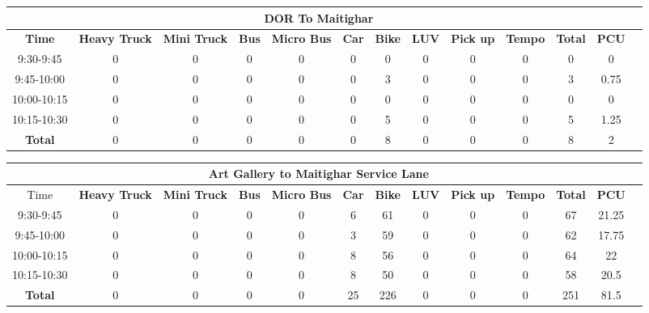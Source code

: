 \begin{landscape}
\centering
\begin{table}[h!]
\centering
\begin{tabular}{|c|c|c|c|c|c|c|c|c|c|c|c|c|}
    \hline
    \multicolumn{12}{|c|}{\textbf{DOR To Maitighar}} \\
    \hline
    \textbf{Time} & \textbf{Heavy Truck} & \textbf{Mini Truck} & \textbf{Bus} & \textbf{Micro Bus} & \textbf{Car} & \textbf{Bike} & \textbf{LUV} & \textbf{Pick up} & \textbf{Tempo} & \textbf{\textbf{Total}} & \textbf{PCU} \\
    \hline
   9:30-9:45	&0	&0	&0	&0	&0	&0	&0	&0	&0	&0	&0 \\ \hline
    9:45-10:00	&0	&0	&0	&0	&0	&3	&0	&0	&0	&3	&0.75 \\ \hline
    10:00-10:15	&0	&0	&0	&0	&0	&0	&0	&0	&0	&0	&0 \\ \hline
    10:15-10:30	&0	&0	&0	&0	&0	&5	&0	&0	&0	&5	&1.25 \\ \hline
    \textbf{Total} & 0 & 0 & 0 & 0 & 0 & 8 & 0 & 0 & 0 & 8 & 2 \\ \hline


\end{tabular}

\vspace{0.5cm}

\begin{tabular}{|c|c|c|c|c|c|c|c|c|c|c|c|c|}
    \hline
    \multicolumn{12}{|c|}{\textbf{Art Gallery to Maitighar Service Lane}} \\
    \hline
        Time & \textbf{Heavy Truck} & \textbf{Mini Truck} & \textbf{Bus} & \textbf{Micro Bus} & \textbf{Car} & \textbf{Bike} & \textbf{LUV} & \textbf{Pick up} & \textbf{Tempo} & \textbf{\textbf{Total}} & \textbf{PCU} \\
    \hline
    9:30-9:45	&0	&0	&0	&0	&6	&61	&0	&0	&0	&67	&21.25 \\ \hline
    9:45-10:00	&0	&0	&0	&0	&3	&59	&0	&0	&0	&62	&17.75 \\ \hline
    10:00-10:15	&0	&0	&0	&0	&8	&56	&0	&0	&0	&64	&22 \\ \hline
    10:15-10:30	&0	&0	&0	&0	&8	&50	&0	&0	&0	&58	&20.5 \\ \hline
    \textbf{Total} & 0 & 0 & 0 & 0 & 25 & 226 & 0 & 0 & 0 & 251 & 81.5 \\ \hline
\end{tabular}

\vspace{0.5cm}


\end{table}
\end{landscape}
